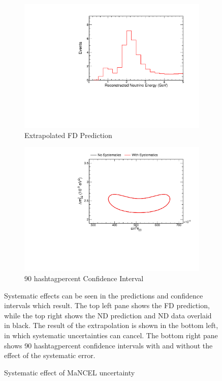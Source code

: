 {\begin{figure}
\begin{center}
\vspace{20pt}

\begin{subfigure}[c]{0.49\textwidth}
\includegraphics[width=\textwidth]{figures/systs/prediction/fd_extrap_prediction_MaNCEL.pdf}
\caption*{Extrapolated FD Prediction}
\end{subfigure}
\begin{subfigure}[c]{0.49\textwidth}
\includegraphics[width=\textwidth]{figures/systs/prediction/fd_extrap_contour_MaNCEL.pdf}
\caption*{90 hashtagpercent Confidence Interval}
\end{subfigure}
\end{center}
\caption{Systematic effect of MaNCEL uncertainty}{
Systematic effects can be seen in the predictions and confidence intervals
which result.
The top left pane shows the FD prediction, while the top right shows the
ND prediction and ND data overlaid in black.
The result of the extrapolation is shown in the bottom left, in which
systematic uncertainties can cancel.
The bottom right pane shows 90 hashtagpercent confidence intervals with and without
the effect of the systematic error.}
\label{syst_fig_MaNCEL}


\end{figure}}
